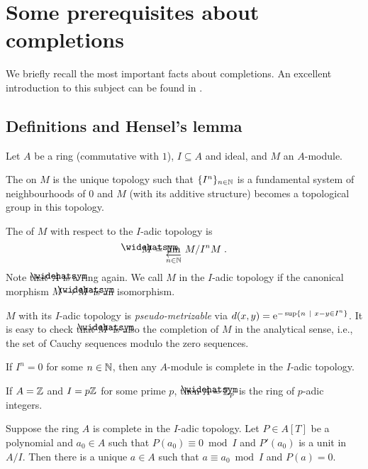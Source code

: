 \documentclass[a4paper,parskip=half,numbers=enddot, DIV=12]{scrreprt}
\begin{document}
\section{Some prerequisites about completions}
We briefly recall the most important facts about completions. An excellent introduction to this subject can be found in \cite[Section~10]{atiyahMacdonald}.
\subsection{Definitions and Hensel's lemma}
\begin{defi}
	Let $A$ be a ring (commutative with $1$), $I\subseteq A$ and ideal, and $M$ an $A$-module.
	\begin{alphanumerate}
		\item The  on $M$ is the unique topology such that $\{I^n\}_{n\in \mathbb{N}}$ is a fundamental system of neighbourhoods of $0$ and $M$ (with its additive structure) becomes a topological group in this topology.
		\item The  of $M$ with respect to the $I$-adic topology is
		\begin{align*}
			\roof{M}=\limit[n\in \IN]M/I^nM\;.
		\end{align*}
		Note that $\roof{A}$ is a ring again. We call $M$  in the $I$-adic topology if the canonical morphism $M\morphism\roof{M}$ is an isomorphism.
	\end{alphanumerate}
\end{defi}
\begin{rem}
	$M$ with its $I$-adic topology is \emph{pseudo-metrizable} via $d(x,y)=\mathrm{e}^{-\sup\left\{n\ \middle|\  x-y\in I^n\right\}}$. It is easy to check that $\roof{M}$ is also the completion of $M$ in the analytical sense, i.e., the set of Cauchy sequences modulo the zero sequences.
\end{rem}
\begin{example}
	If $I^n=0$ for some $n\in \mathbb{N}$, then any $A$-module is complete in the $I$-adic topology.
\end{example}
\begin{example}
	If $A=\mathbb{Z}$ and $I=p\mathbb{Z}$ for some prime $p$, then $\roof{A}=\IZ_p$ is the ring of $p$-adic integers.
\end{example}
\begin{prop}
	Suppose the ring $A$ is complete in the $I$-adic topology. Let $P\in A[T]$ be a polynomial and $a_0\in A$ such that $P(a_0)\equiv 0\bmod I$ and $P'(a_0)$ is a unit in $A/I$. Then there is a unique $a\in A$ such that $a\equiv a_0\bmod I$ and $P(a)=0$.
\end{prop}
\end{document}
